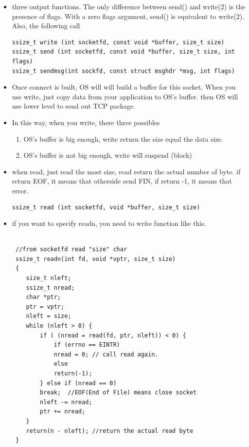 \documentclass[a4paper,11pt,twoside]{book}
\begin{document}
\begin{itemize}
	\item three output functions. The  only difference between send() and write(2) is the
	presence of flags.  With a zero flags argument, send() is equivalent to  write(2).   Also,
	the following call
	
\begin{lstlisting}
ssize_t write (int socketfd, const void *buffer, size_t size)
ssize_t send (int socketfd, const void *buffer, size_t size, int flags)
ssize_t sendmsg(int sockfd, const struct msghdr *msg, int flags)	
\end{lstlisting}
	\item Once connect is built, OS will will build a buffer for this socket, When you use write, just copy data from your application to OS's buffer. then OS will use lower level to send out TCP package.
	
	\item In this way, when you write, there three possibles
	\begin{enumerate}
		\item OS's buffer is big enough, write return the size equal the data size.
		\item OS's buffer is not big enough, write will suspend (block)
	\end{enumerate}

	\item when read, just read the most size, read return the actual number of byte.  if return EOF, it means that otherside send FIN,  if return -1, it means that error.
\begin{lstlisting}
ssize_t read (int socketfd, void *buffer, size_t size)	
\end{lstlisting}	

 \item if you want to specify readn, you need to write function like this.
 
 \begin{lstlisting}

 //from socketfd read "size" char
 ssize_t readn(int fd, void *vptr, size_t size)
 {
 	size_t nleft;
 	ssize_t nread;
 	char *ptr;
 	ptr = vptr;
 	nleft = size;
 	while (nleft > 0) {
 		if ( (nread = read(fd, ptr, nleft)) < 0) {
 			if (errno == EINTR)
 			nread = 0; // call read again.
 			else
 			return(-1);
 		} else if (nread == 0)
 		break;  //EOF(End of File) means close socket
 		nleft -= nread;
 		ptr += nread;
 	}
 	return(n - nleft); //return the actual read byte 
 }
 \end{lstlisting}


\end{itemize}
\end{document}
